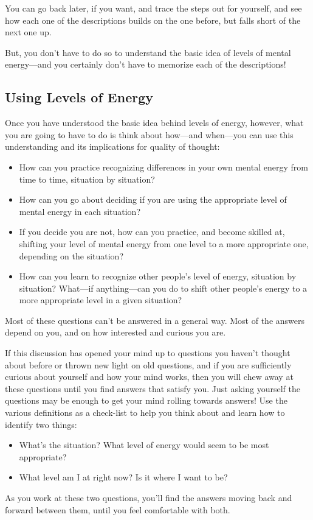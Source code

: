 \documentclass[a5paper]{article}
\begin{document}
You can go back later, if you want, and trace the steps out for yourself, and see how each one of the descriptions builds on the one before, but falls short of the next one up.

But, you don't have to do so to understand the basic idea of levels of mental energy---and you certainly don't have to memorize each of the descriptions!

\subsection{Using Levels of Energy}
Once you have understood the basic idea behind levels of energy, however, what you are going to have to do is think about how---and when---you can use this understanding and its implications for quality of thought:
\begin{itemize}
  \item How can you practice recognizing differences in your own mental energy from time to time, situation by situation?
  \item How can you go about deciding if you are using the appropriate level of mental energy in each situation?
  \item If you decide you are not, how can you practice, and become skilled at, shifting your level of mental energy from one level to a more appropriate
 one, depending on the situation?
  \item How can you learn to recognize other people's level of energy, situation by situation? What---if anything---can you do to shift other people's energy to a more appropriate level in a given situation?
\end{itemize}

Most of these questions can't be answered in a general way.
Most of the answers depend on you, and on how interested and curious you are.

If this discussion has opened your mind up to questions you haven't thought about before or thrown new light on old questions, and if you are sufficiently curious about yourself and how your mind works, then you will chew away at these questions until you find answers that satisfy you.
Just asking yourself the questions may be enough to get your mind rolling towards answers!
Use the various definitions as a check-list to help you think about and
learn how to identify two things:
\begin{itemize}
  \item What's the situation?
    What level of energy would seem to be most appropriate?
  \item What level am I at right now?
    Is it where I want to be?
\end{itemize}
As you work at these two questions, you'll find the answers moving back and forward between them, until you feel comfortable with both.
\end{document}

